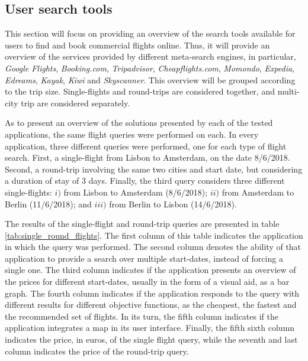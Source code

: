 \subsection{User search tools}
\label{sec:user_st}

This section will focus on providing an overview of the search tools available for users to find and book commercial flights online. Thus, it will provide an overview of the services provided by different meta-search engines, in particular, \textit{Google Flights}, \textit{Booking.com}, \textit{Tripadvisor}, \textit{Cheapflights.com}, \textit{Momondo}, \textit{Expedia}, \textit{Edreams}, \textit{Kayak}, \textit{Kiwi} and \textit{Skyscanner}. This overview will be grouped according to the trip size. Single-flights and round-trips are considered together, and multi-city trip are considered separately.

As to present an overview of the solutions presented by each of the tested applications, the same flight queries were performed on each. In every application, three different queries were performed, one for each type of flight search. First, a single-flight from Lisbon to Amsterdam, on the date 8/6/2018. Second, a round-trip involving the same two cities and start date, but considering a duration of stay of 3 days. Finally, the third query considers three different single-flights: $i)$ from Lisbon to Amsterdam (8/6/2018); $ii)$ from Amsterdam to Berlin (11/6/2018); and $iii)$ from Berlin to Lisbon (14/6/2018).

The results of the single-flight and round-trip queries are presented in table \ref{tab:single_round_flights}. The first column of this table indicates the application in which the query was performed. The second column denotes the ability of that application to provide a search over multiple start-dates, instead of forcing a single one. The third column indicates if the application presents an overview of the prices for different start-dates, usually in the form of a visual aid, as a bar graph. The fourth column indicates if the application responds to the query with different results for different objective functions, as the cheapest, the fastest and the recommended set of flights. In its turn, the fifth column indicates if the application integrates a map in its user interface. Finally, the fifth sixth column indicates the price, in euros, of the single flight query, while the seventh and last column indicates the price of the round-trip query.


